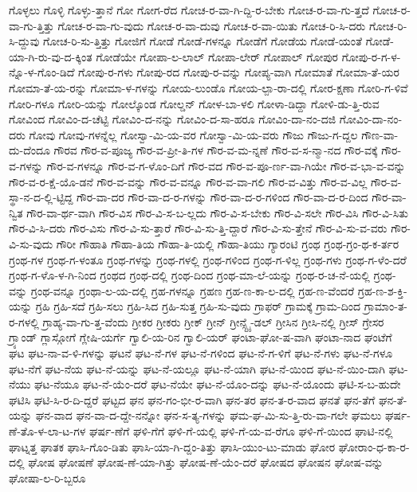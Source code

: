{ಗೊಳ್ಳಲು
ಗೊಳ್ಳಿ
ಗೊಳ್ಳು-ತ್ತಾನೆ
ಗೋ
ಗೋಗ-ರೆದ
ಗೋಚ-ರ-ವಾ-ಗಿ-ದ್ದಿ-ರ-ಬೇಕು
ಗೋಚ-ರ-ವಾ-ಗು-ತ್ತದೆ
ಗೋಚ-ರ-ವಾ-ಗು-ತ್ತಿತ್ತು
ಗೋಚ-ರ-ವಾ-ಗು-ವುದು
ಗೋಚ-ರ-ವಾ-ದುವು
ಗೋಚ-ರ-ವಾ-ಯಿತು
ಗೋಚ-ರಿ-ಸಿ-ದರು
ಗೋಚ-ರಿ-ಸಿ-ದ್ದುವು
ಗೋಚ-ರಿ-ಸು-ತ್ತಿತ್ತು
ಗೋಜಿಗೆ
ಗೋಡೆ
ಗೋಡೆ-ಗಳನ್ನೂ
ಗೋಡೆಗೆ
ಗೋಡೆಯ
ಗೋಡೆ-ಯಂತೆ
ಗೋಡೆ-ಯಾ-ಗಿ-ರು-ವು-ದ-ಕ್ಕಿಂತ
ಗೋಡೆಯೇ
ಗೋಪಾ-ಲ-ಲಾಲ್
ಗೋಪಾ-ಲೇರ್
ಗೋಪಾಲ್
ಗೋಪುರ
ಗೋಪು-ರ-ಗ-ಳ-ನ್ನೊ-ಳ-ಗೊಂ-ಡಿದೆ
ಗೋಪು-ರ-ಗಳು
ಗೋಪು-ರದ
ಗೋಪು-ರ-ವನ್ನು
ಗೋಪ್ಯ-ವಾಗಿ
ಗೋಮಾತೆ
ಗೋಮಾ-ತೆ-ಯರ
ಗೋಮಾ-ತೆ-ಯ-ರನ್ನು
ಗೋಮಾ-ಳ-ಗಳನ್ನು
ಗೋಯ-ಲುಂಡೊ
ಗೋಯ-ಲ್ಪಾ-ರಾ-ದಲ್ಲಿ
ಗೋರ-ಕ್ಷಣಾ
ಗೋರಿ-ಗ-ಳಿವೆ
ಗೋರಿ-ಗಳೂ
ಗೋರಿ-ಯನ್ನು
ಗೋಲ್ಕೊಂಡ
ಗೋಲ್ಡನ್
ಗೋಳ-ಬಾ-ಳಲಿ
ಗೋಳಾ-ಡಿದ್ದಾ
ಗೋಳಿ-ಡು-ತ್ತಿ-ರುವ
ಗೋವಿಂದ
ಗೋವಿಂ-ದ-ಚೆಟ್ಟಿ
ಗೋವಿಂ-ದ-ನನ್ನು
ಗೋವಿಂ-ದ-ಸಾ-ಹರೂ
ಗೋವಿಂ-ದಾ-ನಂ-ದಜಿ
ಗೋವಿಂ-ದಾ-ನಂ-ದರು
ಗೋವು
ಗೋವು-ಗಳನ್ನೆಲ್ಲ
ಗೋಸ್ವಾ-ಮಿ-ಯ-ವರ
ಗೋಸ್ವಾ-ಮಿ-ಯ-ವರು
ಗೌಜು
ಗೌಜು-ಗ-ದ್ದಲ
ಗೌಣ-ವಾ-ದು-ದೆಂದೂ
ಗೌರವ
ಗೌರ-ವ-ಪೂಜ್ಯ
ಗೌರ-ವ-ಪ್ರೀ-ತಿ-ಗಳ
ಗೌರ-ವ-ಮ-ನ್ನಣೆ
ಗೌರ-ವ-ಸ-ನ್ಮಾ-ನದ
ಗೌರ-ವಕ್ಕೆ
ಗೌರ-ವ-ಗಳನ್ನು
ಗೌರ-ವ-ಗಳನ್ನೂ
ಗೌರ-ವ-ಗ-ಳೊಂ-ದಿಗೆ
ಗೌರ-ವದ
ಗೌರ-ವ-ಪೂ-ರ್ಣ-ವಾ-ಗಿಯೇ
ಗೌರ-ವ-ಭಾ-ವ-ವನ್ನು
ಗೌರ-ವ-ರ-ಕ್ಷೆ-ಯೊ-ಡನೆ
ಗೌರ-ವ-ವನ್ನು
ಗೌರ-ವ-ವನ್ನೂ
ಗೌರ-ವ-ವಾ-ಗಲಿ
ಗೌರ-ವ-ವಿತ್ತು
ಗೌರ-ವ-ವಿಲ್ಲ
ಗೌರ-ವ-ಸ್ಥಾ-ನ-ದ-ಲ್ಲಿ-ಟ್ಟಿದ್ದ
ಗೌರ-ವಾ-ದರ
ಗೌರ-ವಾ-ದ-ರ-ಗಳನ್ನು
ಗೌರ-ವಾ-ದ-ರ-ಗಳಿಂದ
ಗೌರ-ವಾ-ದ-ರ-ದಿಂದ
ಗೌರ-ವಾ-ನ್ವಿತ
ಗೌರ-ವಾ-ರ್ಥ-ವಾಗಿ
ಗೌರ-ವಿಸ
ಗೌರ-ವಿ-ಸ-ಬ-ಲ್ಲದು
ಗೌರ-ವಿ-ಸ-ಬೇಕು
ಗೌರ-ವಿ-ಸಲೇ
ಗೌರ-ವಿಸಿ
ಗೌರ-ವಿ-ಸಿತು
ಗೌರ-ವಿ-ಸಿ-ದರು
ಗೌರ-ವಿಸು
ಗೌರ-ವಿ-ಸು-ತ್ತಾರೆ
ಗೌರ-ವಿ-ಸು-ತ್ತಿ-ದ್ದಾರೆ
ಗೌರ-ವಿ-ಸು-ತ್ತೇನೆ
ಗೌರ-ವಿ-ಸು-ವ-ವರು
ಗೌರ-ವಿ-ಸು-ವುದು
ಗೌರೀ
ಗೌಹಾತಿ
ಗೌಹಾ-ತಿಯ
ಗೌಹಾ-ತಿ-ಯಲ್ಲಿ
ಗೌಹಾ-ತಿಯು
ಗ್ಯಾರಂಟಿ
ಗ್ರಂಥ
ಗ್ರಂಥ-ಗ್ರಂ-ಥ-ಕ-ರ್ತರ
ಗ್ರಂಥ-ಗಳ
ಗ್ರಂಥ-ಗ-ಳಂತೂ
ಗ್ರಂಥ-ಗಳನ್ನು
ಗ್ರಂಥ-ಗಳಲ್ಲಿ
ಗ್ರಂಥ-ಗಳಿಂದ
ಗ್ರಂಥ-ಗ-ಳಿಲ್ಲ
ಗ್ರಂಥ-ಗಳು
ಗ್ರಂಥ-ಗ-ಳೆಂ-ದರೆ
ಗ್ರಂಥ-ಗ-ಳೊ-ಳ-ಗಿ-ನಿಂದ
ಗ್ರಂಥದ
ಗ್ರಂಥ-ದಲ್ಲಿ
ಗ್ರಂಥ-ದಿಂದ
ಗ್ರಂಥ-ಮಾ-ಲೆ-ಯನ್ನು
ಗ್ರಂಥ-ರ-ಚ-ನೆ-ಯಲ್ಲಿ
ಗ್ರಂಥ-ವನ್ನು
ಗ್ರಂಥ-ವನ್ನೂ
ಗ್ರಂಥಾ-ಲ-ಯ-ದಲ್ಲಿ
ಗ್ರಹ-ಗಳನ್ನೂ
ಗ್ರಹಣ
ಗ್ರಹ-ಣ-ಕಾ-ಲ-ದಲ್ಲಿ
ಗ್ರಹ-ಣ-ವೆಂದರೆ
ಗ್ರಹ-ಣ-ಶ-ಕ್ತಿ-ಯನ್ನು
ಗ್ರಹಿ
ಗ್ರಹಿ-ಸದೆ
ಗ್ರಹಿ-ಸಲು
ಗ್ರಹಿ-ಸಿದ
ಗ್ರಹಿ-ಸುತ್ತ
ಗ್ರಹಿ-ಸು-ವುದು
ಗ್ರಾಫರ್
ಗ್ರಾಮಕ್ಕೆ
ಗ್ರಾಮ-ದಿಂದ
ಗ್ರಾಮಾಂ-ತ-ರ-ಗಳಲ್ಲಿ
ಗ್ರಾಹ್ಯ-ವಾ-ಗು-ತ್ತ-ವೆಂದು
ಗ್ರೀಕರ
ಗ್ರೀಕರು
ಗ್ರೀಕ್
ಗ್ರೀನ್
ಗ್ರೀನ್ಸ್ಟೈ-ಡಲ್
ಗ್ರೀಸಿನ
ಗ್ರೀಸಿ-ನಲ್ಲಿ
ಗ್ರೀಸ್
ಗ್ರೇಸರ
ಗ್ರ್ಯಾಂಡ್
ಗ್ಲಾಸ್ಗೋಗೆ
ಗ್ಲೇಷಿ-ಯರ್ಗೆ
ಗ್ವಾಲಿ-ಯ-ರಿನ
ಗ್ವಾಲಿ-ಯರ್
ಘಂಟಾ-ಘೋ-ಷ-ವಾಗಿ
ಘಂಟಾ-ನಾದ
ಘಂಟೆಗೆ
ಘಟ
ಘಟ-ನಾ-ವ-ಳಿ-ಗಳನ್ನು
ಘಟನೆ
ಘಟ-ನೆ-ಗಳ
ಘಟ-ನೆ-ಗಳಿಂದ
ಘಟ-ನೆ-ಗ-ಳಿಗೆ
ಘಟ-ನೆ-ಗಳು
ಘಟ-ನೆ-ಗಳೂ
ಘಟ-ನೆಗೆ
ಘಟ-ನೆಯ
ಘಟ-ನೆ-ಯನ್ನು
ಘಟ-ನೆ-ಯಲ್ಲೂ
ಘಟ-ನೆ-ಯಾಗಿ
ಘಟ-ನೆ-ಯಿಂದ
ಘಟ-ನೆ-ಯಿಂ-ದಾಗಿ
ಘಟ-ನೆಯು
ಘಟ-ನೆಯೂ
ಘಟ-ನೆ-ಯೆಂ-ದರೆ
ಘಟ-ನೆಯೇ
ಘಟ-ನೆ-ಯೊಂ-ದನ್ನು
ಘಟ-ನೆ-ಯೊಂದು
ಘಟಿ-ಸ-ಬ-ಹುದೇ
ಘಟಿಸಿ
ಘಟಿ-ಸಿ-ರ-ದಿ-ದ್ದರೆ
ಘಟ್ಟದ
ಘನ
ಘನ-ಗಂ-ಭೀ-ರ-ವಾಗಿ
ಘನ-ತರ
ಘನ-ತ-ರ-ವಾದ
ಘನತೆ
ಘನ-ತೆಗೆ
ಘನ-ತೆ-ಯನ್ನು
ಘನ-ವಾದ
ಘನ-ವಾ-ದ-ದ್ದೇ-ನನ್ನೋ
ಘನ-ಸ-ತ್ಯ-ಗಳನ್ನು
ಘಮ-ಘ-ಮಿ-ಸು-ತ್ತಿ-ರು-ವಾ-ಗಲೇ
ಘಮಲು
ಘರ್ಷ-ಣೆ-ತೊ-ಳ-ಲಾ-ಟ-ಗಳ
ಘರ್ಷ-ಣೆಗೆ
ಘಳಿ-ಗೆಗೆ
ಘಳಿ-ಗೆ-ಯಲ್ಲಿ
ಘಳಿ-ಗೆ-ಯ-ವ-ರೆಗೂ
ಘಳಿ-ಗೆ-ಯಿಂದ
ಘಾಟಿ-ನಲ್ಲಿ
ಘಾಟ್ನತ್ತ
ಘಾತಕ
ಘಾಸಿ-ಗೊಂ-ಡಿತು
ಘಾಸಿ-ಯಾ-ಗಿ-ದ್ದಂ-ತಿತ್ತು
ಘಾಸಿ-ಯುಂ-ಟು-ಮಾಡು
ಘೋರ
ಘೋರಾಂ-ಧ-ಕಾ-ರ-ದಲ್ಲಿ
ಘೋಷ
ಘೋಷಣೆ
ಘೋಷ-ಣೆ-ಯಾ-ಗಿತ್ತು
ಘೋಷ-ಣೆ-ಯೆಂ-ದರೆ
ಘೋಷದ
ಘೋಷನ
ಘೋಷ-ವನ್ನು
ಘೋಷಾ-ಲ-ರಿ-ಬ್ಬರೂ
}
